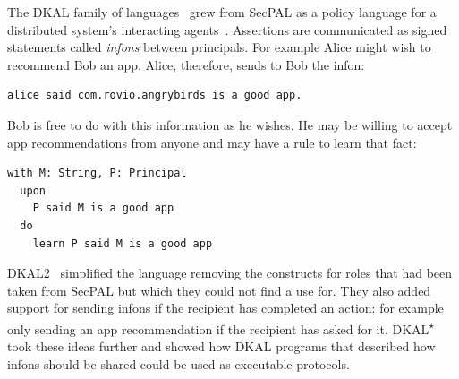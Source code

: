 \documentclass[thesis.tex]{subfiles}
\begin{document}
The DKAL family of
languages~\cite{jeannin_dkal*:_2013,gurevich_dkal:_2008,yuri_gurevich_dkal2---simplified_2009}
grew from SecPAL as a policy language for a distributed system's
interacting agents~\cite{blass_introduction_2012}.  Assertions are
communicated as signed statements called \emph{infons} between
principals.  For example Alice might wish to recommend Bob an app.
Alice, therefore, sends to Bob the infon:

\begin{lstlisting}
alice said com.rovio.angrybirds is a good app.
\end{lstlisting}

Bob is free to do with this information as he wishes.  He may be
willing to accept app recommendations from anyone and may have a rule
to learn that fact:

\begin{lstlisting}
with M: String, P: Principal
  upon
    P said M is a good app
  do
    learn P said M is a good app
\end{lstlisting}

DKAL2~\cite{yuri_gurevich_dkal2---simplified_2009} simplified the
language removing the constructs for roles that had been taken from
SecPAL but which they could not find a use for.  They also added
support for sending infons if the recipient has completed an action:
for example only sending an app recommendation if the recipient has
asked for it.
DKAL\textsuperscript{$\star$}~\cite{jeannin_dkal*:_2013} took these
ideas further and showed how DKAL programs that described how infons
should be shared could be used as executable protocols.
\end{document}
